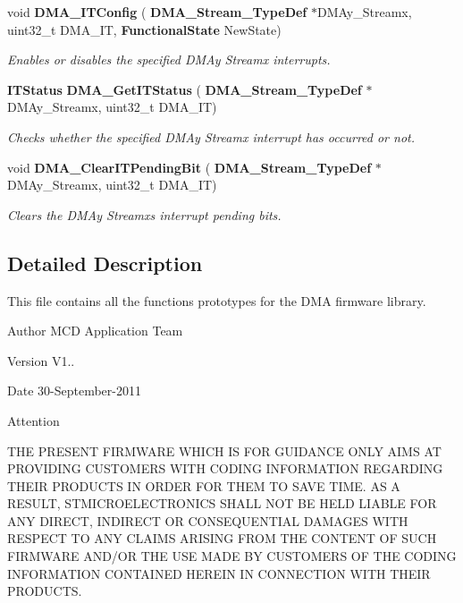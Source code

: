 \begin{DoxyCompactItemize}
void \textbf{ D\+M\+A\+\_\+\+I\+T\+Config} (\textbf{ D\+M\+A\+\_\+\+Stream\+\_\+\+Type\+Def} $\ast$D\+M\+Ay\+\_\+\+Streamx, uint32\+\_\+t D\+M\+A\+\_\+\+IT, \textbf{ Functional\+State} New\+State)
\begin{DoxyCompactList}\small\item\em Enables or disables the specified D\+M\+Ay Streamx interrupts. \end{DoxyCompactList}\item 
\textbf{ I\+T\+Status} \textbf{ D\+M\+A\+\_\+\+Get\+I\+T\+Status} (\textbf{ D\+M\+A\+\_\+\+Stream\+\_\+\+Type\+Def} $\ast$D\+M\+Ay\+\_\+\+Streamx, uint32\+\_\+t D\+M\+A\+\_\+\+IT)
\begin{DoxyCompactList}\small\item\em Checks whether the specified D\+M\+Ay Streamx interrupt has occurred or not. \end{DoxyCompactList}\item 
void \textbf{ D\+M\+A\+\_\+\+Clear\+I\+T\+Pending\+Bit} (\textbf{ D\+M\+A\+\_\+\+Stream\+\_\+\+Type\+Def} $\ast$D\+M\+Ay\+\_\+\+Streamx, uint32\+\_\+t D\+M\+A\+\_\+\+IT)
\begin{DoxyCompactList}\small\item\em Clears the D\+M\+Ay Streamx\textquotesingle{}s interrupt pending bits. \end{DoxyCompactList}\end{DoxyCompactItemize}


\subsection{Detailed Description}
This file contains all the functions prototypes for the D\+MA firmware library. 

\begin{DoxyAuthor}{Author}
M\+CD Application Team 
\end{DoxyAuthor}
\begin{DoxyVersion}{Version}
V1.. 
\end{DoxyVersion}
\begin{DoxyDate}{Date}
30-\/\+September-\/2011 
\end{DoxyDate}
\begin{DoxyAttention}{Attention}

\end{DoxyAttention}
T\+HE P\+R\+E\+S\+E\+NT F\+I\+R\+M\+W\+A\+RE W\+H\+I\+CH IS F\+OR G\+U\+I\+D\+A\+N\+CE O\+N\+LY A\+I\+MS AT P\+R\+O\+V\+I\+D\+I\+NG C\+U\+S\+T\+O\+M\+E\+RS W\+I\+TH C\+O\+D\+I\+NG I\+N\+F\+O\+R\+M\+A\+T\+I\+ON R\+E\+G\+A\+R\+D\+I\+NG T\+H\+E\+IR P\+R\+O\+D\+U\+C\+TS IN O\+R\+D\+ER F\+OR T\+H\+EM TO S\+A\+VE T\+I\+ME. AS A R\+E\+S\+U\+LT, S\+T\+M\+I\+C\+R\+O\+E\+L\+E\+C\+T\+R\+O\+N\+I\+CS S\+H\+A\+LL N\+OT BE H\+E\+LD L\+I\+A\+B\+LE F\+OR A\+NY D\+I\+R\+E\+CT, I\+N\+D\+I\+R\+E\+CT OR C\+O\+N\+S\+E\+Q\+U\+E\+N\+T\+I\+AL D\+A\+M\+A\+G\+ES W\+I\+TH R\+E\+S\+P\+E\+CT TO A\+NY C\+L\+A\+I\+MS A\+R\+I\+S\+I\+NG F\+R\+OM T\+HE C\+O\+N\+T\+E\+NT OF S\+U\+CH F\+I\+R\+M\+W\+A\+RE A\+N\+D/\+OR T\+HE U\+SE M\+A\+DE BY C\+U\+S\+T\+O\+M\+E\+RS OF T\+HE C\+O\+D\+I\+NG I\+N\+F\+O\+R\+M\+A\+T\+I\+ON C\+O\+N\+T\+A\+I\+N\+ED H\+E\+R\+E\+IN IN C\+O\+N\+N\+E\+C\+T\+I\+ON W\+I\+TH T\+H\+E\+IR P\+R\+O\+D\+U\+C\+TS.

